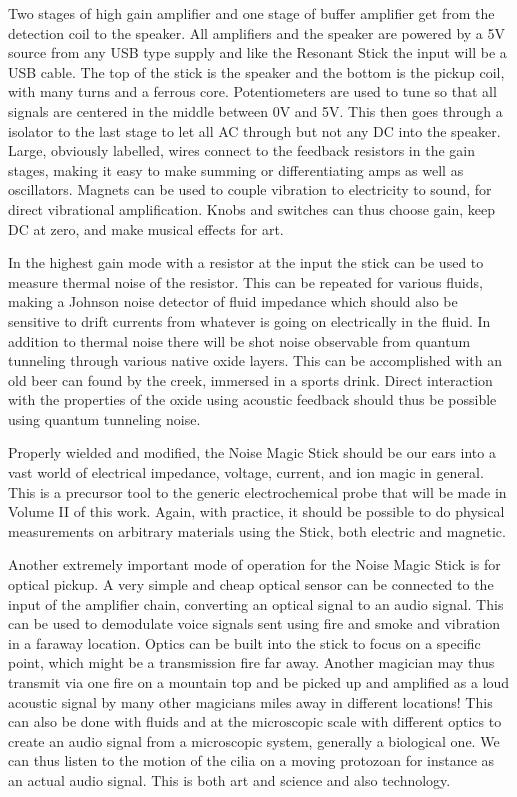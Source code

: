 Two stages of high gain amplifier and one stage of buffer amplifier get
from the detection coil to the speaker. All amplifiers and the speaker
are powered by a 5V source from any USB type supply and like the
Resonant Stick the input will be a USB cable. The top of the stick is
the speaker and the bottom is the pickup coil, with many turns and a
ferrous core. Potentiometers are used to tune so that all signals are
centered in the middle between 0V and 5V. This then goes through a
isolator to the last stage to let all AC through but not any DC into the
speaker. Large, obviously labelled, wires connect to the feedback
resistors in the gain stages, making it easy to make summing or
differentiating amps as well as oscillators. Magnets can be used to
couple vibration to electricity to sound, for direct vibrational
amplification. Knobs and switches can thus choose gain, keep DC at zero,
and make musical effects for art.

In the highest gain mode with a resistor at the input the stick can be
used to measure thermal noise of the resistor. This can be repeated for
various fluids, making a Johnson noise detector of fluid impedance which
should also be sensitive to drift currents from whatever is going on
electrically in the fluid. In addition to thermal noise there will be
shot noise observable from quantum tunneling through various native
oxide layers. This can be accomplished with an old beer can found by the
creek, immersed in a sports drink. Direct interaction with the
properties of the oxide using acoustic feedback should thus be possible
using quantum tunneling noise.

Properly wielded and modified, the Noise Magic Stick should be our ears
into a vast world of electrical impedance, voltage, current, and ion
magic in general. This is a precursor tool to the generic
electrochemical probe that will be made in Volume II of this work.
Again, with practice, it should be possible to do physical measurements
on arbitrary materials using the Stick, both electric and magnetic.

Another extremely important mode of operation for the Noise Magic Stick
is for optical pickup. A very simple and cheap optical sensor can be
connected to the input of the amplifier chain, converting an optical
signal to an audio signal. This can be used to demodulate voice signals
sent using fire and smoke and vibration in a faraway location. Optics
can be built into the stick to focus on a specific point, which might be
a transmission fire far away. Another magician may thus transmit via one
fire on a mountain top and be picked up and amplified as a loud acoustic
signal by many other magicians miles away in different locations! This
can also be done with fluids and at the microscopic scale with different
optics to create an audio signal from a microscopic system, generally a
biological one. We can thus listen to the motion of the cilia on a
moving protozoan for instance as an actual audio signal. This is both
art and science and also technology.

